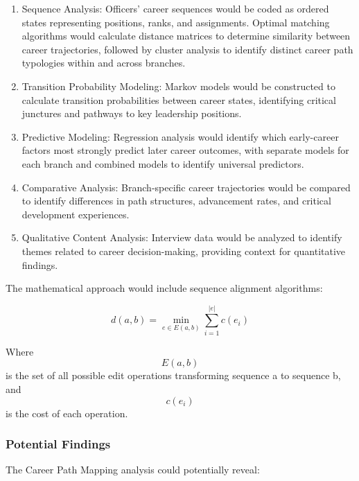 \documentclass[
  letterpaper,
  DIV=11,
  numbers=noendperiod]{scrartcl}
\begin{document}
\begin{enumerate}
\def\labelenumi{\arabic{enumi}.}
\item
  Sequence Analysis: Officers' career sequences would be coded as
  ordered states representing positions, ranks, and assignments. Optimal
  matching algorithms would calculate distance matrices to determine
  similarity between career trajectories, followed by cluster analysis
  to identify distinct career path typologies within and across
  branches.
\item
  Transition Probability Modeling: Markov models would be constructed to
  calculate transition probabilities between career states, identifying
  critical junctures and pathways to key leadership positions.
\item
  Predictive Modeling: Regression analysis would identify which
  early-career factors most strongly predict later career outcomes, with
  separate models for each branch and combined models to identify
  universal predictors.
\item
  Comparative Analysis: Branch-specific career trajectories would be
  compared to identify differences in path structures, advancement
  rates, and critical development experiences.
\item
  Qualitative Content Analysis: Interview data would be analyzed to
  identify themes related to career decision-making, providing context
  for quantitative findings.
\end{enumerate}

The mathematical approach would include sequence alignment algorithms:

\[ d(a,b) = \min_{e \in E(a,b)} \sum_{i=1}^{|e|} c(e_i) \]

Where \[E(a,b)\] is the set of all possible edit operations transforming
sequence a to sequence b, and \[c(e_i)\] is the cost of each operation.

\subsubsection{Potential Findings}\label{potential-findings}

The Career Path Mapping analysis could potentially reveal:
\end{document}
